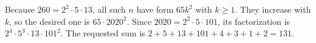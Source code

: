 Because $260=2^2\cdot5\cdot13$, all such $n$ have form $65k^2$ with $k\ge1$. They increase with $k$, so the desired one is $65\cdot2020^2$. Since $2020=2^2\cdot5\cdot101$, its factorization is $2^4\cdot5^3\cdot13\cdot101^2$. The requested sum is $2+5+13+101+4+3+1+2=\boxed{131}$.
